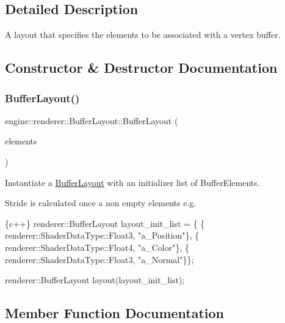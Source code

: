\subsection{Detailed Description}
A layout that specifies the elements to be associated with a vertex buffer. 

\subsection{Constructor \& Destructor Documentation}
\mbox{\label{classengine_1_1renderer_1_1BufferLayout_aad7d69ca7a55c528fd619bc2f51635f0}} 
\subsubsection{\texorpdfstring{Buffer\+Layout()}{BufferLayout()}}
{\footnotesize\ttfamily engine\+::renderer\+::\+Buffer\+Layout\+::\+Buffer\+Layout (\begin{DoxyParamCaption}\item[{const std\+::initializer\+\_\+list$<$ \hyperlink{structengine_1_1renderer_1_1BufferElement}{Buffer\+Element} $>$ \&}]{elements }\end{DoxyParamCaption})\hspace{0.3cm}{\ttfamily [inline]}}



Instantiate a \hyperlink{classengine_1_1renderer_1_1BufferLayout}{Buffer\+Layout} with an initializer list of Buffer\+Elements. 

Stride is calculated once a non empty elements e.\+g. 
\begin{DoxyCode}
\{c++\}
  renderer::BufferLayout layout\_init\_list = \{
      \{ renderer::ShaderDataType::Float3, \textcolor{stringliteral}{"a\_Position"}\},
      \{ renderer::ShaderDataType::Float4, \textcolor{stringliteral}{"a\_Color"}\},
      \{ renderer::ShaderDataType::Float3, \textcolor{stringliteral}{"a\_Normal"}\}\};

  renderer::BufferLayout layout(layout\_init\_list);
\end{DoxyCode}
 

\subsection{Member Function Documentation}
\mbox{\label{classengine_1_1renderer_1_1BufferLayout_abf525eed067da7cfa637c9fe795767b5}} 
